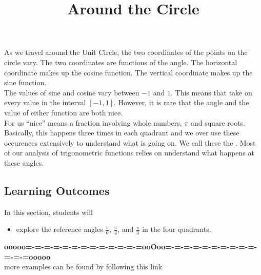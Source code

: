 \documentclass{ximera}
\title{Around the Circle}
\begin{document}
\begin{abstract}
\end{abstract}
\maketitle



As we travel around the Unit Circle, the two coordinates of the points on the circle vary.  The two coordinates are functions of the angle.   The horizontal coordinate makes up the cosine function. The vertical coordinate makes up the sine function.  \\


The values of sine and cosine vary between $-1$ and $1$.  This means that take on every value in the interval $[-1, 1]$.  However, it is rare that the angle and the value of either function are both nice. \\


For us ``nice'' means a fraction involving whole numbers, $\pi$ and square roots. \\


Basically, this happens three times in each quadrant and we over use these occurences extensively to understand what is going on.  We call these the .  Most of our analysis of trigonometric functions relies on understand what happens at these angles.
















\subsection{Learning Outcomes}

\begin{sectionOutcomes}
In this section, students will 

\begin{itemize}
\item explore the reference angles $\frac{\pi}{6}$, $\frac{\pi}{4}$, and $\frac{\pi}{3}$ in the four quadrants.
\end{itemize}
\end{sectionOutcomes}











\begin{center}
\textbf{\textcolor{green!50!black}{ooooo=-=-=-=-=-=-=-=-=-=-=-=-=ooOoo=-=-=-=-=-=-=-=-=-=-=-=-=ooooo}} \\

more examples can be found by following this link\\ 

\end{center}
\end{document}
